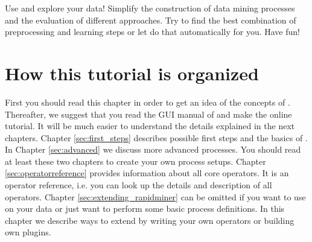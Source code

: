 \bigskip


Use \rapidminer and explore your data! Simplify the construction of data mining processes and
the evaluation of different approaches. Try to find the best combination of
preprocessing and learning steps or let \rapidminer do that automatically for
you. Have fun!




\section{How this tutorial is organized}

First you should read this chapter in order to get an idea of the concepts of
\rapidminer. Thereafter, we suggest that you read the GUI manual of \rapidminer
and make the online tutorial. It will be much easier to understand the
details explained in the next chapters. Chapter \ref{sec:first_steps}
describes possible first steps and the basics of \rapidminer. In Chapter
\ref{sec:advanced} we discuss more advanced processes. You should
read at least these two chapters to create your own
process setups. 
Chapter \ref{sec:operatorreference} provides information
about all \rapidminer core operators. It is an operator reference, i.e. you
can look up the details and description of all operators. 
Chapter \ref{sec:extending_rapidminer} can be omitted if you want to use
\rapidminer on your data or just want to perform some basic
process definitions. In this chapter we describe ways to extend \rapidminer by
writing your own operators or building own plugins.

